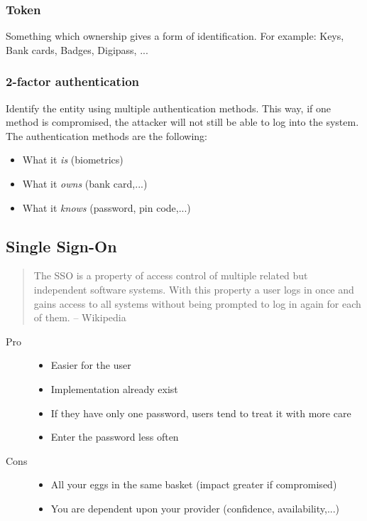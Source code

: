 \subsubsection{Token}
Something which ownership gives a form of identification.
For example: Keys, Bank cards, Badges, Digipass, ...

\subsubsection{2-factor authentication}
Identify the entity using multiple authentication methods.
This way, if one method is compromised, the attacker will not still be able to
log into the system.
The authentication methods are the following:
\begin{itemize}
\item What it \emph{is} (biometrics)
\item What it \emph{owns} (bank card,...)
\item What it \emph{knows} (password, pin code,...)
\end{itemize}

\subsection{Single Sign-On}
\begin{quote}
The SSO is a property of access control of multiple related but independent
software systems. With this property a user logs in once and gains access to
all systems without being prompted to log in again for each of them.
-- Wikipedia
\end{quote}

\begin{description}
\item[Pro]
\hfill
\begin{itemize}
\item Easier for the user
\item Implementation already exist
\item If they have only one password, users tend to treat it with more care
\item Enter the password less often
\end{itemize}
\item[Cons]
\hfill
\begin{itemize}
\item All your eggs in the same basket (impact greater if compromised)
\item You are dependent upon your provider (confidence, availability,...)
\end{itemize}
\end{description}


